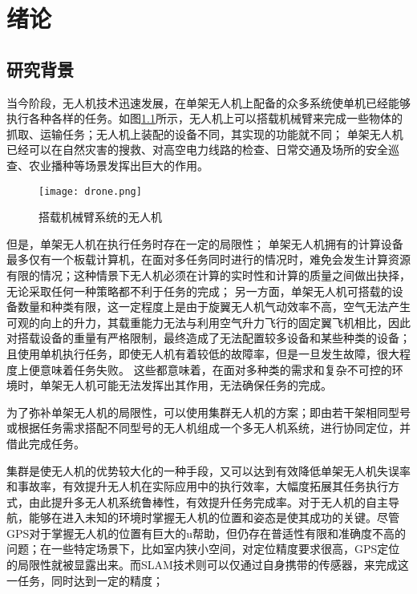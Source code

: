 \renewcommand{\baselinestretch}{1.5}
\fontsize{12pt}{13pt}\selectfont

\chapter{绪论}\label{preface}

\section{研究背景}

当今阶段，无人机技术迅速发展，在单架无人机上配备的众多系统使单机已经能够执行各种各样的任务。如图\ref{fig-drone}所示，无人机上可以搭载机械臂来完成一些物体的抓取、运输任务；无人机上装配的设备不同，其实现的功能就不同；
单架无人机已经可以在自然灾害的搜救、对高空电力线路的检查、日常交通及场所的安全巡查、农业播种等场景发挥出巨大的作用。

\begin{figure}[!ht]
	\centering
	\texttt{[image: drone.png]}
	\caption{搭载机械臂系统的无人机} 
	\label{fig-drone}
\end{figure}

但是，单架无人机在执行任务时存在一定的局限性；
单架无人机拥有的计算设备最多仅有一个板载计算机，在面对多任务同时进行的情况时，难免会发生计算资源有限的情况；这种情景下无人机必须在计算的实时性和计算的质量之间做出抉择，无论采取任何一种策略都不利于任务的完成；
另一方面，单架无人机可搭载的设备数量和种类有限，这一定程度上是由于旋翼无人机气动效率不高，空气无法产生可观的向上的升力，其载重能力无法与利用空气升力飞行的固定翼飞机相比，因此对搭载设备的重量有严格限制，最终造成了无法配置较多设备和某些种类的设备；
且使用单机执行任务，即使无人机有着较低的故障率，但是一旦发生故障，很大程度上便意味着任务失败。
这些都意味着，在面对多种类的需求和复杂不可控的环境时，单架无人机可能无法发挥出其作用，无法确保任务的完成。

为了弥补单架无人机的局限性，可以使用集群无人机的方案；即由若干架相同型号或根据任务需求搭配不同型号的无人机组成一个多无人机系统，进行协同定位，并借此完成任务。

集群是使无人机的优势较大化的一种手段，又可以达到有效降低单架无人机失误率和事故率，有效提升无人机在实际应用中的执行效率，大幅度拓展其任务执行方式，由此提升多无人机系统鲁棒性，有效提升任务完成率。对于无人机的自主导航，能够在进入未知的环境时掌握无人机的位置和姿态是使其成功的关键。尽管GPS对于掌握无人机的位置有巨大的u帮助，但仍存在普适性有限和准确度不高的问题；在一些特定场景下，比如室内狭小空间，对定位精度要求很高，GPS定位的局限性就被显露出来。而SLAM技术则可以仅通过自身携带的传感器，来完成这一任务，同时达到一定的精度；

